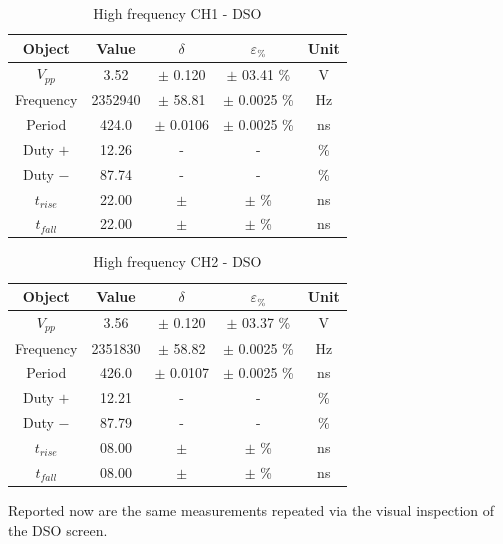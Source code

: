 \documentclass[../main.tex]{subfiles}
\begin{document}
\begin{table}[h!]
\centering	

\begin{tabular}{ccccc}
\textbf{Object} & \textbf{Value} & \textbf{$\delta$} & \textbf{$\varepsilon_{\%}$} &  \textbf{Unit} \\
\hline
 $V_{pp}$ & 3.52  & $\pm$ 0.120 & $\pm$ 03.41 \% &  V \\
 \hline
 Frequency & 2352940 & $\pm$ 58.81 & $\pm$ 0.0025 \% & Hz \\
 \hline
 Period & 424.0  & $\pm$ 0.0106 & $\pm$ 0.0025 \% & ns \\
 \hline
 Duty $+$ & 12.26  & -  & - &  \% \\ 
 \hline
 Duty $-$ & 87.74  & -  & - &  \% \\ 
 \hline
 $t_{rise}$ &  22.00  & $\pm$  & $\pm$   \% &  ns \\ 
 \hline
 $t_{fall}$ &  22.00 & $\pm$  & $\pm$  \% &  ns \\
 

\end{tabular}
\caption*{High frequency CH1 - DSO}
\end{table}


\begin{table}[h!]
\centering	

\begin{tabular}{ccccc}
\textbf{Object} & \textbf{Value} & \textbf{$\delta$} & \textbf{$\varepsilon_{\%}$} &  \textbf{Unit} \\
\hline
 $V_{pp}$ & 3.56  & $\pm$ 0.120 & $\pm$ 03.37 \% &  V \\
 \hline
 Frequency & 2351830 & $\pm$ 58.82 & $\pm$ 0.0025 \% & Hz \\
 \hline
 Period & 426.0  & $\pm$ 0.0107 & $\pm$ 0.0025 \% & ns \\
 \hline
 Duty $+$ & 12.21  & -  & - &  \% \\ 
 \hline
 Duty $-$ & 87.79  & -  & - &  \% \\ 
 \hline
 $t_{rise}$ &  08.00  & $\pm$  & $\pm$   \% &  ns \\ 
 \hline
 $t_{fall}$ &  08.00 & $\pm$  & $\pm$  \% &  ns \\
 

\end{tabular}
\caption*{High frequency CH2 - DSO}
\end{table}


Reported now are the same measurements repeated via the visual inspection of the DSO screen.
\end{document}
